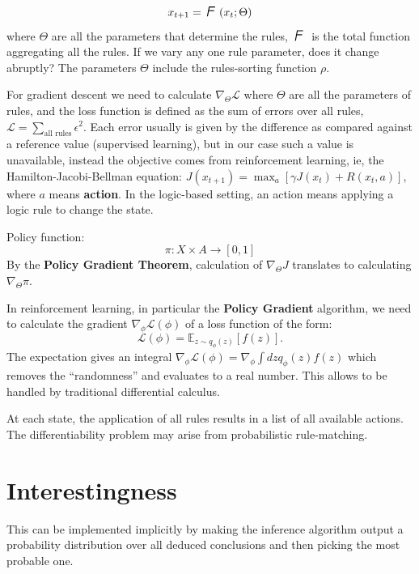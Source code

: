 \begin{equation}
x_{t+1} = \squareF(x_t; \Theta)
\end{equation}
where $\Theta$ are all the parameters that determine the rules, $\squareF$ is the total function aggregating all the rules.  If we vary any one rule parameter, does it change abruptly?  The parameters $\Theta$ include the rules-sorting function $\rho$.

For gradient descent we need to calculate $\nabla_\Theta \mathcal{L}$ where $\Theta$ are all the parameters of rules, and the loss function is defined as the sum of errors over all rules, $\displaystyle \mathcal{L} = \sum_{\text{all rules}} \epsilon^2 $.  Each error usually is given by the difference as compared against a reference value (supervised learning), but in our case such a value is unavailable, instead the objective comes from reinforcement learning, ie, the Hamilton-Jacobi-Bellman equation:  $\displaystyle J(x_{t+1}) = \max_a [ \gamma J(x_t) + R(x_t,a) ] $, where $a$ means \textbf{action}.  In the logic-based setting, an action means applying a logic rule to change the state.  

Policy function:
\begin{equation}
\pi: X \times A \rightarrow [0,1]
\end{equation}
By the \textbf{Policy Gradient Theorem}, calculation of $\nabla_\Theta J$ translates to calculating $\nabla_\Theta \pi$.

In reinforcement learning, in particular the \textbf{Policy Gradient} algorithm, we need to calculate the gradient $\nabla_\phi \mathcal{L}(\phi)$ of a loss function of the form:
\begin{equation}
\mathcal{L}(\phi) = \mathbb{E}_{z \sim q_\phi(z)}[ f(z) ] .
\end{equation}
The expectation gives an integral $\displaystyle \nabla_\phi \mathcal{L}(\phi) = \nabla_\phi \int dz q_\phi(z) f(z)$ which removes the ``randomness'' and evaluates to a real number.  This allows to be handled by traditional differential calculus.

At each state, the application of all rules results in a list of all available actions.  The differentiability problem may arise from probabilistic rule-matching.  

\section{Interestingness}

This can be implemented implicitly by making the inference algorithm output a probability distribution over all deduced conclusions and then picking the most probable one.

